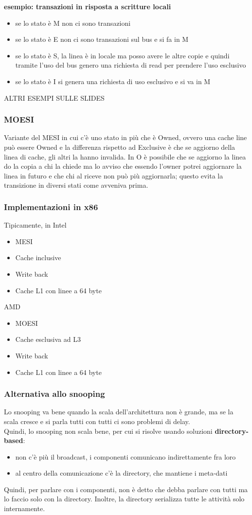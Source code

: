 \documentclass[12pt, oneside]{extbook}
\begin{document}
\textbf{esempio: transazioni in risposta a scritture locali}\\
\begin{itemize}
\item se lo stato è M non ci sono transazioni
\item se lo stato è E non ci sono transazioni sul bus e si fa in M
\item se lo stato è S, la linea è in locale ma posso avere le altre copie e quindi tramite l'uso del bus genero una richiesta di read per prendere l'uso esclusivo
\item se lo stato è I si genera una richiesta di uso esclusivo e si va in M
\end{itemize}
ALTRI ESEMPI SULLE SLIDES
\subsubsection{MOESI}
Variante del MESI in cui c'è uno stato in più che è Owned, ovvero una cache line può essere Owned e la differenza rispetto ad Exclusive è che se aggiorno della linea di cache, gli altri la hanno invalida. In O è possibile che se aggiorno la linea do la copia a chi la chiede ma lo avviso che essendo l'owner potrei aggiornare la linea in futuro e che chi al riceve non può più aggiornarla; questo evita la transizione in diversi stati come avveniva prima.
\subsubsection{Implementazioni in x86}
Tipicamente, in Intel
\begin{itemize}
\item MESI
\item Cache inclusive
\item Write back
\item Cache L1 con linee a 64 byte
\end{itemize}
AMD
\begin{itemize}
\item MOESI
\item Cache esclusiva ad L3
\item Write back
\item Cache L1 con linee a 64 byte
\end{itemize}
\subsubsection{Alternativa allo snooping}
Lo snooping va bene quando la scala dell'architettura non è grande, ma se la scala cresce e si parla tutti con tutti ci sono problemi di delay.\\ Quindi, lo snooping non scala bene, per cui si risolve usando soluzioni \textbf{directory-based}:
\begin{itemize}
\item non c'è più il broadcast, i componenti comunicano indirettamente fra loro
\item al centro della comunicazione c'è la directory, che mantiene i meta-dati
\end{itemize}
Quindi, per parlare con i componenti, non è detto che debba parlare con tutti ma lo faccio solo con la directory. Inoltre, la directory serializza tutte le attività solo internamente.
\end{document}
